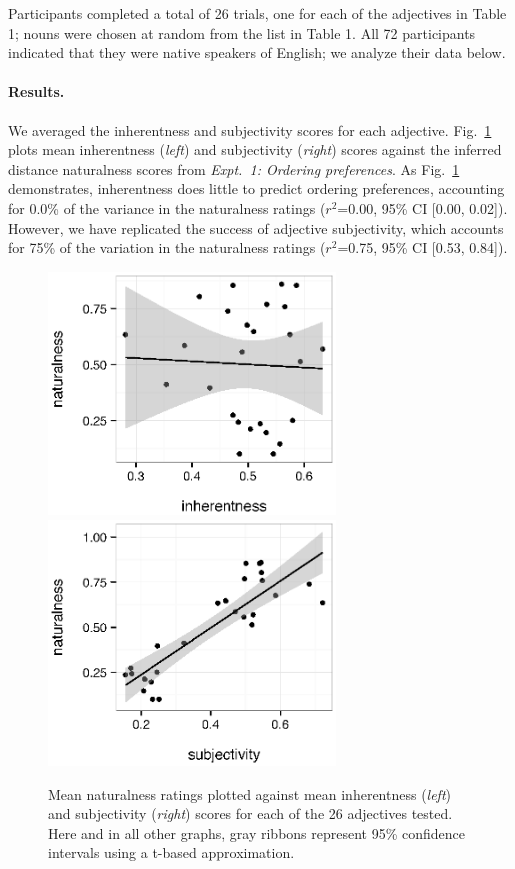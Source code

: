 \documentclass[12pt]{article}
\begin{document}
Participants completed a total of 26 trials, one for each of the adjectives in Table 1; nouns were chosen at random from the list in Table 1. All 72 participants indicated that they were native speakers of English; we analyze their data below.

\paragraph{Results.} We averaged the inherentness and subjectivity scores for each adjective. Fig.~\ref{fig:inherentness} plots mean inherentness (\emph{left}) and subjectivity (\emph{right}) scores against the inferred distance naturalness scores from \textit{Expt.~1: Ordering preferences}. As Fig.~\ref{fig:inherentness} demonstrates, inherentness does little to predict ordering preferences, accounting for 0.0\% of the variance in the naturalness ratings ($r^2${=}0.00, 95\% CI [0.00,  0.02]). However, we have replicated the success of adjective subjectivity, which accounts for 75\% of the variation in the naturalness ratings ($r^2${=}0.75, 95\% CI [0.53,  0.84]).

\renewcommand\thefigure{A.\arabic{figure}}
\begin{figure}
	\centering\includegraphics[width=3in]{plots/expt1-inherentness-naturalness.eps}\includegraphics[width=3in]{plots/expt1-subjectivity2-naturalness.eps}
	\caption{Mean naturalness ratings plotted against mean inherentness (\emph{left}) and subjectivity (\emph{right}) scores for each of the 26 adjectives tested. Here and in all other graphs, gray ribbons represent 95\% confidence intervals using a t-based approximation.}\label{fig:inherentness}
\end{figure}
\end{document}

